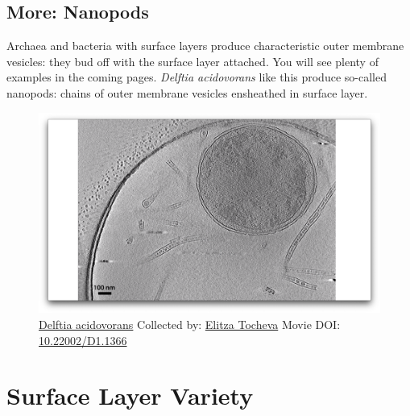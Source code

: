 \documentclass[]{tufte-book}
\begin{document}
\hypertarget{Nanopods}{\subsection*{More: Nanopods}\label{Nanopods}}

Archaea and bacteria with surface layers produce characteristic outer
membrane vesicles: they bud off with the surface layer attached. You
will see plenty of examples in the coming pages. \emph{Delftia
acidovorans} like this produce so-called nanopods: chains of outer
membrane vesicles ensheathed in surface layer.





\begin{figure}
\includegraphics{movie_stills/2_6a} \caption[\protect\hyperlink{tree}{Delftia acidovorans} Collected by:
\protect\hyperlink{elitza_tocheva}{Elitza Tocheva} Movie DOI:
\href{https://doi.org/10.22002/D1.1366}{10.22002/D1.1366}]{\protect\hyperlink{tree}{Delftia acidovorans} Collected by:
\protect\hyperlink{elitza_tocheva}{Elitza Tocheva} Movie DOI:
\href{https://doi.org/10.22002/D1.1366}{10.22002/D1.1366}}\label{fig:2-6a}
\end{figure}

\section{Surface Layer Variety}\label{surface-layer-variety}
\end{document}
